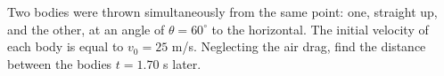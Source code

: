 
\item Two bodies were thrown simultaneously from the same point: one, straight up, and the other, at an angle of $\theta = 60^\circ$ to the horizontal. The initial velocity of each body is equal to $v_0 = 25$ m/s. Neglecting the air drag, find the distance between the bodies $t = 1.70$ s later.
